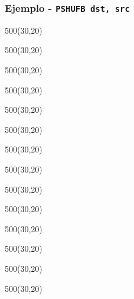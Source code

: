 \documentclass[aspectratio=169]{beamer}
\begin{document}
\begin{frame}[fragile,t]
	\frametitle{Ejemplo - \texttt{PSHUFB dst, src}}
	\begin{textblock}{500}(30,20)  \end{textblock}  %
	\begin{textblock}{500}(30,20)  \end{textblock}  %
	\begin{textblock}{500}(30,20)  \end{textblock}  %
	\begin{textblock}{500}(30,20)  \end{textblock}  %
	\begin{textblock}{500}(30,20)  \end{textblock}  %
	\begin{textblock}{500}(30,20)  \end{textblock}  %
	\begin{textblock}{500}(30,20)  \end{textblock}  %
	\begin{textblock}{500}(30,20)  \end{textblock}  %
	\begin{textblock}{500}(30,20)  \end{textblock}  %
	\begin{textblock}{500}(30,20)  \end{textblock} %
	\begin{textblock}{500}(30,20)  \end{textblock} %
	\begin{textblock}{500}(30,20)  \end{textblock} %
	\begin{textblock}{500}(30,20)  \end{textblock} %
	\begin{textblock}{500}(30,20)  \end{textblock} %

\end{frame}
\end{document}
